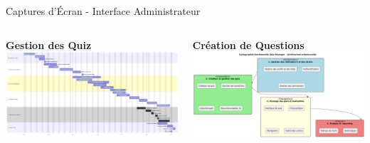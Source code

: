 \documentclass[aspectratio=169]{beamer}
\begin{document}
\begin{frame}{Captures d'Écran - Interface Administrateur}
    \begin{columns}
        \begin{center}
            \textbf{Gestion des Quiz}\\[0.3cm]
            \includegraphics[width=\textwidth]{latex_media/media/image10.png}
        \end{center}

        \begin{center}
            \textbf{Création de Questions}\\[0.3cm]
            \includegraphics[width=\textwidth]{latex_media/media/image11.png}
        \end{center}
    \end{columns}
\end{frame}
\end{document}
